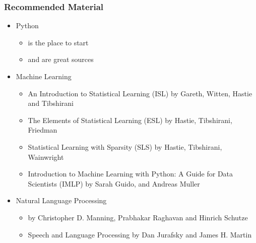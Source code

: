 \documentclass[compress, aspectratio=54]{beamer}
\begin{document}
\begin{frame}
\frametitle{Recommended Material}
\begin{itemize}
\item Python
\begin{itemize}

\item \href{https://www.codecademy.com/catalog/language/python}{\color{ blue}{Codecademy}} is the place to start
\item \href{https://automatetheboringstuff.com/}{\color{ blue}{Automate the Boring Stuff with Python}} and \href{https://realpython.com/}{\color{ blue}{The Real Python}} are great sources
%
\end{itemize}

\item Machine Learning 
\begin{itemize}

\item An Introduction to Statistical Learning (ISL) by Gareth, Witten,  Hastie and Tibshirani
\item  The Elements of Statistical Learning (ESL) by Hastie, Tibshirani, Friedman
\item  Statistical Learning with Sparsity (SLS) by Hastie, Tibshirani, Wainwright
\item  Introduction to Machine Learning with Python: A Guide for Data Scientists (IMLP) by Sarah Guido, and Andreas Muller
\end{itemize}

\item Natural Language Processing
\begin{itemize}

\item \href{https://nlp.stanford.edu/IR-book/information-retrieval-book.html}{\color{ blue}{Introduction to Information Retrieval}} by Christopher D. Manning, Prabhakar Raghavan and Hinrich Schutze

\item  Speech and Language Processing by Dan Jurafsky and James H. Martin
\end{itemize}
\end{itemize}

\end{frame}

\end{document}

